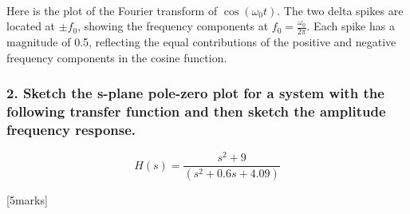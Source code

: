 \documentclass[11pt]{article}
\newcommand{\prompt}[4]{
        {\ttfamily\llap{{\color{#2}[#3]:\hspace{3pt}#4}}\vspace{-\baselineskip}}
    }
\begin{document}
            
\prompt{Out}{outcolor}{5}{}
    
    \begin{center}
    \end{center}
    { \hspace*{\fill} \\}
    

    Here is the plot of the Fourier transform of \(\cos(\omega_0 t)\). The
two delta spikes are located at \(\pm f_0\), showing the frequency
components at \(f_0 = \frac{\omega_0}{2\pi}\). Each spike has a
magnitude of 0.5, reflecting the equal contributions of the positive and
negative frequency components in the cosine function.

    \subsubsection{2. Sketch the s-plane pole-zero plot for a system with
the following transfer function and then sketch the amplitude frequency
response.}\label{sketch-the-s-plane-pole-zero-plot-for-a-system-with-the-following-transfer-function-and-then-sketch-the-amplitude-frequency-response.}

\[
𝐻(𝑠) = \frac{s^2 + 9}{(𝑠^2 + 0.6𝑠 + 4.09)}
\]

{[}5marks{]}
\end{document}
